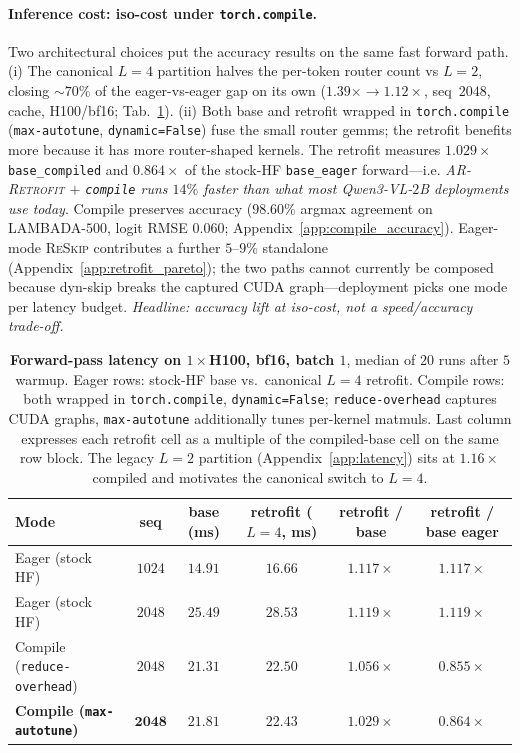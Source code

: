 \documentclass{article}
\newcommand{\reskip}{\textsc{ReSkip}}
\newcommand{\retrofit}{\textsc{AR-Retrofit}}
\begin{document}
\paragraph{Inference cost: iso-cost under \texttt{torch.compile}.}
Two architectural choices put the accuracy results on the same fast forward path. (i) The canonical $L{=}4$ partition halves the per-token router count vs $L{=}2$, closing $\sim$$70\%$ of the eager-vs-eager gap on its own ($1.39\times \to 1.12\times$, seq~$2048$, cache, H100/bf16; Tab.~\ref{tab:retrofit_latency}). (ii) Both base and retrofit wrapped in \texttt{torch.compile} (\texttt{max-autotune}, \texttt{dynamic=False}) fuse the small router gemms; the retrofit benefits more because it has more router-shaped kernels. The retrofit measures $\mathbf{1.029\times}$ \texttt{base\_compiled} and $\mathbf{0.864\times}$ of the stock-HF \texttt{base\_eager} forward---i.e. \emph{\retrofit{} $+$ \texttt{compile} runs $14\%$ faster than what most Qwen3-VL-$2$B deployments use today}. Compile preserves accuracy ($98.60\%$ argmax agreement on LAMBADA-$500$, logit RMSE $0.060$; Appendix~\ref{app:compile_accuracy}). Eager-mode \reskip{} contributes a further $5$--$9\%$ standalone (Appendix~\ref{app:retrofit_pareto}); the two paths cannot currently be composed because dyn-skip breaks the captured CUDA graph---deployment picks one mode per latency budget. \emph{Headline: accuracy lift at iso-cost, not a speed/accuracy trade-off.}

\begin{table}[t]
\caption{\textbf{Forward-pass latency on $1{\times}$H100, bf16, batch $1$}, median of $20$ runs after $5$ warmup. Eager rows: stock-HF base vs.\ canonical $L{=}4$ retrofit. Compile rows: both wrapped in \texttt{torch.compile}, \texttt{dynamic=False}; \texttt{reduce-overhead} captures CUDA graphs, \texttt{max-autotune} additionally tunes per-kernel matmuls. Last column expresses each retrofit cell as a multiple of the compiled-base cell on the same row block. The legacy $L{=}2$ partition (Appendix~\ref{app:latency}) sits at $1.16\times$ compiled and motivates the canonical switch to $L{=}4$.}
\label{tab:retrofit_latency}
\centering\small
\setlength{\tabcolsep}{4pt}
\begin{tabular}{lccccc}
\toprule
Mode & seq & base (ms) & retrofit ($L{=}4$, ms) & retrofit / base & retrofit / base eager \\
\midrule
Eager (stock HF)                          & $1024$ & $14.91$ & $16.66$ & $1.117\times$ & $1.117\times$ \\
Eager (stock HF)                          & $2048$ & $25.49$ & $28.53$ & $1.119\times$ & $1.119\times$ \\
Compile (\texttt{reduce-overhead})        & $2048$ & $21.31$ & $22.50$ & $1.056\times$ & $0.855\times$ \\
\textbf{Compile (\texttt{max-autotune})}  & $\mathbf{2048}$ & $\mathbf{21.81}$ & $\mathbf{22.43}$ & $\mathbf{1.029\times}$ & $\mathbf{0.864\times}$ \\
\bottomrule
\end{tabular}
\end{table}
\end{document}

